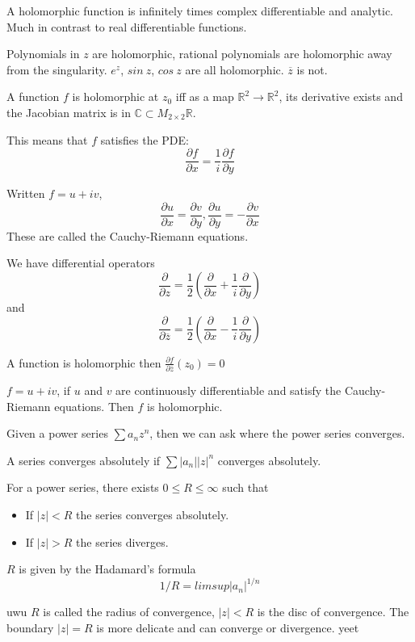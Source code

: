 \documentclass[main.tex]{subfiles}
\begin{document}
\begin{remark}
A holomorphic function is infinitely times complex differentiable and analytic. Much in contrast to real differentiable functions.
\end{remark}

\begin{example} 
Polynomials in $z$ are holomorphic, rational polynomials are holomorphic away from the singularity. $e^z$, $sin \ z$, $cos \ z$ are all holomorphic. $\overline{z}$ is not. 
\end{example}

A function $f$ is holomorphic at $z_0$ iff as a map $\mathbb{R}^2 \rightarrow \mathbb{R}^2$, its derivative exists and the Jacobian matrix is in $\mathbb{C} \subset M_{2 \times 2}\mathbb{R}$.

This means that $f$ satisfies the PDE:
$$
\frac{\partial f}{\partial x} = \frac{1}{i} \frac{\partial f}{\partial y}
$$

Written $f = u + iv$, 
$$
\frac{\partial u}{\partial x} = \frac{\partial v}{\partial y}, \frac{\partial u}{\partial y} = -\frac{\partial v}{\partial x}
$$
These are called the Cauchy-Riemann equations.

We have differential operators
$$
\frac{\partial}{\partial z} = \frac{1}{2} (\frac{\partial}{\partial x} + \frac{1}{i}\frac{\partial}{\partial y})
$$
and 
$$
\frac{\partial}{\partial \overline{z}} = \frac{1}{2} (\frac{\partial}{\partial x} - \frac{1}{i}\frac{\partial}{\partial y})
$$

A function is holomorphic then $\frac{\partial f}{\partial \overline{z}}(z_0) = 0$

\begin{theorem}
$f = u + iv$, if $u$ and $v$ are continuously differentiable and satisfy the Cauchy-Riemann equations. Then $f$ is holomorphic.
\end{theorem}

Given a power series $\sum a_n z^n$, then we can ask where the power series converges.

A series converges absolutely if $\sum|a_n||z|^n $ converges absolutely.

\begin{theorem}
For a power series, there exists $0 \leq R \leq \infty$ such that 
\begin{itemize}
    \item If $|z| < R$ the series converges absolutely.
    \item If $|z| > R$ the series diverges.
\end{itemize}
$R$ is given by the Hadamard's formula 
$$
1/R = lim sup |a_n|^{1/n}
$$
\end{theorem}
uwu
$R$ is called the radius of convergence, $|z| < R$ is the disc of convergence. The boundary $|z| = R$ is more delicate and can converge or divergence. yeet
\end{document}
